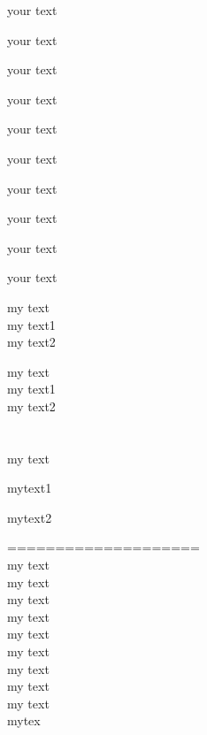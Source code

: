 \documentclass{article}
\begin{document}
	\begin{large}
		your text
	\end{large}

	\begin{Large}
		your text
	\end{Large}

	\begin{LARGE}
		your text
	\end{LARGE}
	
	\begin{huge}
		your text
	\end{huge}

	\begin{Huge}
		your text
	\end{Huge}
	\begin{small}
		your text
	\end{small}
	\begin{tiny}
		your text
	\end{tiny}
	\begin{center}
		your text
	\end{center}
	\begin{flushleft}
		your text
	\end{flushleft}
	\begin{flushright}
		your text
	\end{flushright}

my text\\
my text1\\
my text2

my text\\
my text1\\
my text2\\\\\\

my text

mytext1

mytext2

====================\\
{\tiny my text}\\
{\scriptsize my text}\\
{\footnotesize my text}\\
{\small my text}\\
{\normalsize my text}\\
{\large my text}\\
{\Large my text}\\
{\huge my text}\\
{\Huge my text}\\
{\color{red}mytex}
\end{document}

